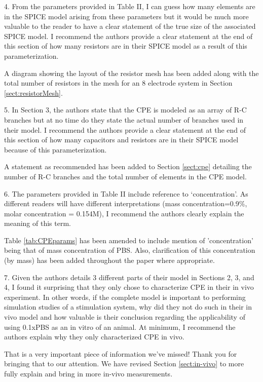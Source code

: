 \documentclass[journal, a4paper]{IEEEtran}
\begin{document}
{    4. From the parameters provided in Table II, I can guess how many elements are in the SPICE model arising from these parameters but it would be much more valuable to the reader to have a clear statement of the true size of the associated SPICE model. I recommend the authors provide a clear statement at the end of this section of how many resistors are in their SPICE model as a result of this parameterization.

    {
        \color{blue}
        A diagram showing the layout of the resistor mesh has been added along with the total number of resistors in the mesh for an 8 electrode system in Section \ref{sect:resistorMesh}.
    }

    5. In Section 3, the authors state that the CPE is modeled as an array of R-C branches but at no time do they state the actual number of branches used in their model. I recommend the authors provide a clear statement at the end of this section of how many capacitors and resistors are in their SPICE model because of this parameterization.

    {
        \color{blue}
        A statement as recommended has been added to Section \ref{sect:cpe} detailing the number of R-C branches and the total number of elements in the CPE model.
    }

    6. The parameters provided in Table II include reference to `concentration'. As different readers will have different interpretations (mass concentration=0.9\%, molar concentration = 0.154M), I recommend the authors clearly explain the meaning of this term.

    {
        \color{blue}
        Table \ref{tab:CPEparams} has been amended to include mention of 'concentration' being that of mass concentration of PBS. Also, clarification of this concentration (by mass) has been added throughout the paper where appropriate.
    }

    7. Given the authors details 3 different parts of their model in Sections 2, 3, and 4, I found it surprising that they only chose to characterize CPE in their in vivo experiment. In other words, if the complete model is important to performing simulation studies of a stimulation system, why did they not do such in their in vivo model and how valuable is their conclusion regarding the applicability of using 0.1xPBS as an in vitro of an animal. At minimum, I recommend the authors explain why they only characterized CPE in vivo.

    {
        \color{blue}
        That is a very important piece of information we've missed! Thank you for bringing that to our attention. We have revised Section \ref{sect:in-vivo} to more fully explain and bring in more in-vivo measurements.
    }

}
\end{document}
